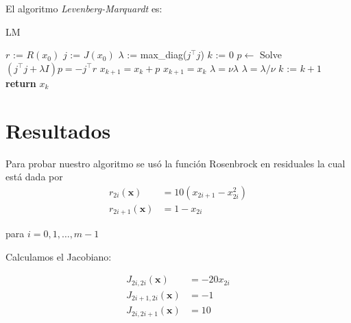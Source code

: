\documentclass{article}
\begin{document}
\begin{multicols}{2}
El algoritmo \emph{Levenberg-Marquardt} es:

\begin{algorithm}[H]
\caption{LM}\label{lm}
\begin{algorithmic}[1]
  \State $r$ := $R(x_0)$
  \State $j$ := $J(x_0)$
  \State $\lambda$ := max\_diag($j^\intercal j$)
  \State $k$ := $0$
    \State $p \leftarrow$ Solve $(j^\intercal j + \lambda I) p = -j^\intercal r$
    \State $x_{k+1} = x_k + p$
    \State $x_{k+1} = x_{k}$
    \State $\lambda = \nu\lambda$
    \Else
    \State $\lambda = \lambda / \nu$
    \EndIf
    \State $k$ := $k + 1$
  \EndWhile
  \State\textbf{return} $x_k$
\EndFunction
\end{algorithmic}
\end{algorithm}

\section{Resultados}
Para probar nuestro algoritmo se usó la función Rosenbrock en residuales la cual está dada por
\begin{align*}
  r_{2i}(\boldsymbol{x}) &= 10(x_{2i+1} - x_{2i}^2)\\
  r_{2i+1}(\boldsymbol{x}) &= 1 - x_{2i}
\end{align*}

para $i = 0, 1, \ldots, m-1$

Calculamos el Jacobiano:

{
\begin{align*}
  J_{2i,2i}(\boldsymbol{x})   &= -20 x_{2i}\\
  J_{2i+1,2i}(\boldsymbol{x}) &= -1\\
  J_{2i,2i+1}(\boldsymbol{x}) &= 10
\end{align*}
}


\end{multicols}
\end{document}
